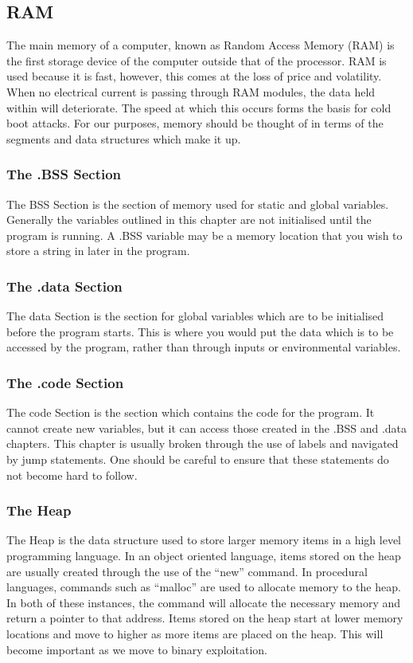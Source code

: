 \documentclass[a4paper,11pt]{report}
\begin{document}
				\subsection{RAM}
					The main memory of a computer, known as Random Access Memory (RAM) is the first storage device of the computer outside that of the processor. 
					RAM is used because it is fast, however, this comes at the loss of price and volatility. 
					When no electrical current is passing through RAM modules, the data held within will deteriorate. 
					The speed at which this occurs forms the basis for cold boot attacks. %
					For our purposes, memory should be thought of in terms of the segments and data structures which make it up. 
					\subsubsection{The .BSS Section}
						The BSS Section is the section of memory used for static and global variables. 
						Generally the variables outlined in this chapter are not initialised until the program is running. 
						A .BSS variable may be a memory location that you wish to store a string in later in the program. 
					\subsubsection{The .data Section}
						The data Section is the section for global variables which are to be initialised before the program starts. 
						This is where you would put the data which is to be accessed by the program, rather than through inputs or environmental variables. 
					\subsubsection{The .code Section}
						The code Section is the section which contains the code for the program. 
						It cannot create new variables, but it can access those created in the .BSS and .data chapters. 
						This chapter is usually broken through the use of labels and navigated by jump statements. 
						One should be careful to ensure that these statements do not become hard to follow. 
					\subsubsection{The Heap}
						The Heap is the data structure used to store larger memory items in a high level programming language. 
						In an object oriented language, items stored on the heap are usually created through the use of the ``new'' command. 
						In procedural languages, commands such as ``malloc'' are used to allocate memory to the heap. 
						In both of these instances, the command will allocate the necessary memory and return a pointer to that address. 
						Items stored on the heap start at lower memory locations and move to higher as more items are placed on the heap. 
						This will become important as we move to binary exploitation. 
\end{document}
